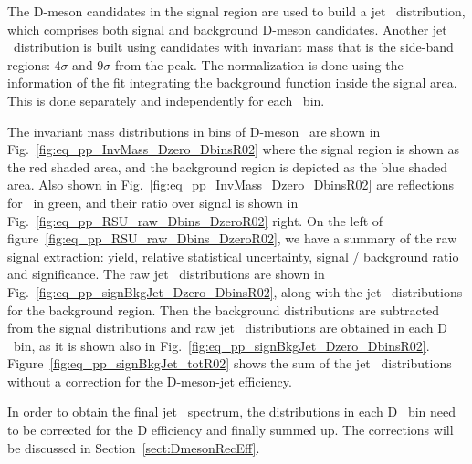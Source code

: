 The D-meson candidates in the signal region are used to build a jet \pt\ distribution, which comprises both signal and background D-meson candidates.
Another jet \pt\ distribution is built using candidates with invariant mass that is the side-band regions: $4\sigma$ and $9\sigma$ from the peak.
The normalization is done using the information of the fit integrating the background function inside the signal area. This is done separately and independently for each \ptd\ bin.

The invariant mass distributions in bins of D-meson \pt\ are shown in Fig.~\ref{fig:eq_pp_InvMass_Dzero_DbinsR02} where  the signal region is shown as the red shaded area, and the background region is depicted as the blue shaded area.
Also shown in Fig.~\ref{fig:eq_pp_InvMass_Dzero_DbinsR02} are reflections for \Dzero\ in green, and their ratio over signal is shown in Fig.~\ref{fig:eq_pp_RSU_raw_Dbins_DzeroR02} right. On the left of figure~\ref{fig:eq_pp_RSU_raw_Dbins_DzeroR02}, we have a summary of the raw signal extraction:
yield, relative statistical uncertainty, signal / background ratio and significance. The raw jet \pt\ distributions are shown in Fig.~\ref{fig:eq_pp_signBkgJet_Dzero_DbinsR02}, along with the jet \pt\ distributions for the background region. 
Then the background distributions are subtracted from the signal distributions and raw jet \pt\ distributions are obtained in each D \pt\ bin, as it is shown also in Fig.~\ref{fig:eq_pp_signBkgJet_Dzero_DbinsR02}.
Figure~\ref{fig:eq_pp_signBkgJet_totR02} shows the sum of the jet \pt\ distributions without a correction for the D-meson-jet efficiency.

In order to obtain the final jet \pt\ spectrum, the distributions in each D \pt\ bin need to be corrected for the D efficiency and finally summed up. The corrections will be discussed in Section~\ref{sect:DmesonRecEff}. 

